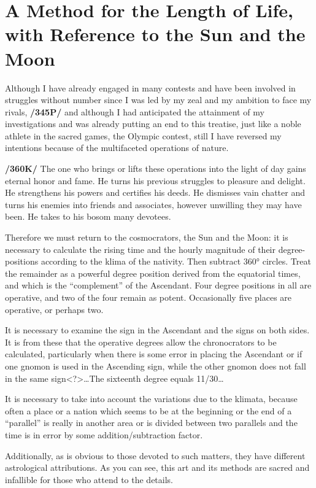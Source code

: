 \section{A Method for the Length of Life, with Reference to the Sun and the Moon}

Although I have already engaged in many contests and have been involved in struggles without number since I was led by my zeal and my ambition to face my rivals, \textbf{/345P/} and although I had
anticipated the attainment of my investigations and was already putting an end to this treatise, just like a noble athlete in the sacred games, the Olympic contest, still I have reversed my intentions because of the
multifaceted operations of nature. 

\textbf{/360K/} The one who brings or lifts these operations into the light of day gains eternal honor and fame. He turns his previous struggles to pleasure and delight. He strengthens his powers and certifies his deeds. He dismisses vain chatter and turns his enemies into friends and associates, however unwilling they may have been. He takes to his bosom many devotees.

Therefore we must return to the cosmocrators, the Sun and the Moon: it is necessary to calculate the rising time and the hourly magnitude of their degree-positions according to the klima of the nativity. Then subtract 360° circles. Treat the remainder as a powerful degree position derived from the equatorial times, and which is the “complement” of the Ascendant. Four degree positions in all are operative, and two of
the four remain as potent. Occasionally five places are operative, or perhaps two.

It is necessary to examine the sign in the Ascendant and the signs on both sides. It is from these that the operative degrees allow the chronocrators to be calculated, particularly when there is some error in
placing the Ascendant or if one gnomon is used in the Ascending sign, while the other gnomon does not fall in the same sign<?>…The sixteenth degree equals 11/30…

It is necessary to take into account the variations due to the klimata, because often a place or a nation which seems to be at the beginning or the end of a “parallel” is really in another area or is divided between
two parallels and the time is in error by some addition/subtraction factor. 

Additionally, as is obvious to those devoted to such matters, they have different astrological attributions. As you can see, this art and its methods are sacred and infallible for those who attend to the details.

\newpage